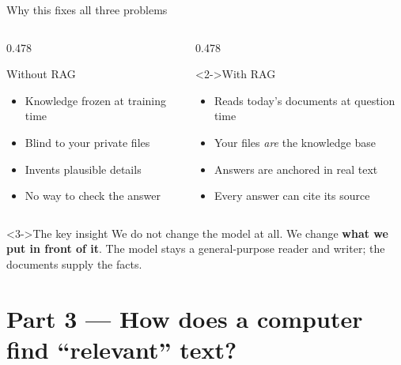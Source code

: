 \documentclass[aspectratio=169,11pt]{beamer}
\begin{document}
\begin{frame}{Why this fixes all three problems}
  \begin{columns}[T,onlytextwidth]
    \begin{column}{0.478\textwidth}
      \begin{alertblock}{Without RAG}
        \begin{itemize}
          \item Knowledge frozen at training time
          \item Blind to your private files
          \item Invents plausible details
          \item No way to check the answer
        \end{itemize}
      \end{alertblock}
    \end{column}
    \begin{column}{0.478\textwidth}
      \begin{exampleblock}<2->{With RAG}
        \begin{itemize}
          \item Reads today's documents at question time
          \item Your files \emph{are} the knowledge base
          \item Answers are anchored in real text
          \item Every answer can cite its source
        \end{itemize}
      \end{exampleblock}
    \end{column}
  \end{columns}
  \bigskip
  \begin{block}<3->{The key insight}
    We do not change the model at all. We change \textbf{what we put in front
    of it}. The model stays a general-purpose reader and writer; the
    documents supply the facts.
  \end{block}
\end{frame}

\section{Part 3 --- How does a computer find ``relevant'' text?}
\end{document}
